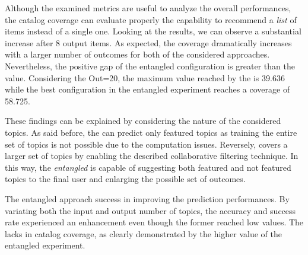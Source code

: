 Although the examined metrics are useful to analyze the overall performances, the catalog coverage can evaluate properly the capability to recommend a \emph{list} of items instead of a single one. Looking at the results, we can observe a substantial increase after 8 output items. As expected, the coverage dramatically increases with a larger number of outcomes for both of the considered approaches. Nevertheless, the positive gap of the entangled configuration is greater than the \MNB value. Considering the Out=20, the maximum value reached by the \MNB is 39.636 while the best configuration in the entangled experiment reaches a coverage of 58.725.

These findings can be explained by considering the nature of the considered topics. As said before, the \MNB can predict only featured topics as training the entire set of \GH topics is not possible due to the computation issues. Reversely, \CT covers a larger set of topics by enabling the described collaborative filtering technique. In this way, the \emph{entangled} is capable of suggesting both featured and not featured topics to the final user and enlarging the possible set of outcomes.



\begin{tcolorbox}[boxrule=0.86pt,left=0.3em, right=0.3em,top=0.1em, bottom=0.05em]
The entangled approach success in improving the prediction performances. By variating both the input and output number of topics, the accuracy and success rate experienced an enhancement even though the former reached low values. The \MNB lacks in catalog coverage, as clearly demonstrated by the higher value of the entangled experiment.
\end{tcolorbox}










